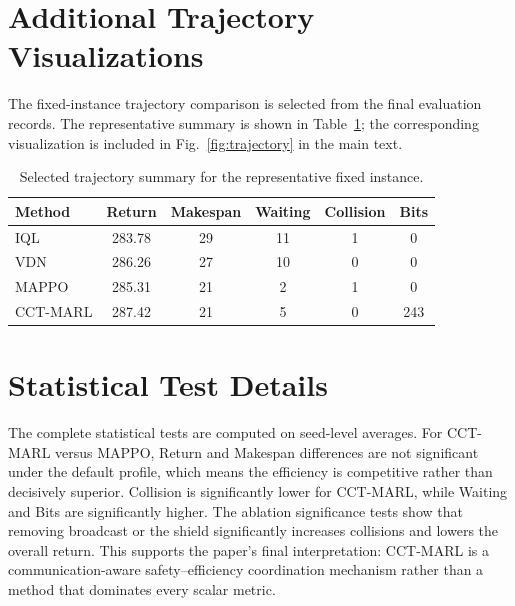 \documentclass[preprint,12pt]{elsarticle}
\begin{document}
\section{Additional Trajectory Visualizations}
The fixed-instance trajectory comparison is selected from the final evaluation records. The representative summary is shown in Table~\ref{tab:trajectory_summary}; the corresponding visualization is included in Fig.~\ref{fig:trajectory} in the main text.


\begin{table}[htbp]
\centering
\caption{Selected trajectory summary for the representative fixed instance.}
\label{tab:trajectory_summary}
\begin{tabular}{lccccc}
\toprule
Method & Return & Makespan & Waiting & Collision & Bits \\
\midrule
IQL & 283.78 & 29 & 11 & 1 & 0 \\
VDN & 286.26 & 27 & 10 & 0 & 0 \\
MAPPO & 285.31 & 21 & 2 & 1 & 0 \\
CCT-MARL & 287.42 & 21 & 5 & 0 & 243 \\
\bottomrule
\end{tabular}
\end{table}


\section{Statistical Test Details}
The complete statistical tests are computed on seed-level averages. For CCT-MARL versus MAPPO, Return and Makespan differences are not significant under the default profile, which means the efficiency is competitive rather than decisively superior. Collision is significantly lower for CCT-MARL, while Waiting and Bits are significantly higher. The ablation significance tests show that removing broadcast or the shield significantly increases collisions and lowers the overall return. This supports the paper's final interpretation: CCT-MARL is a communication-aware safety--efficiency coordination mechanism rather than a method that dominates every scalar metric.


\end{document}
